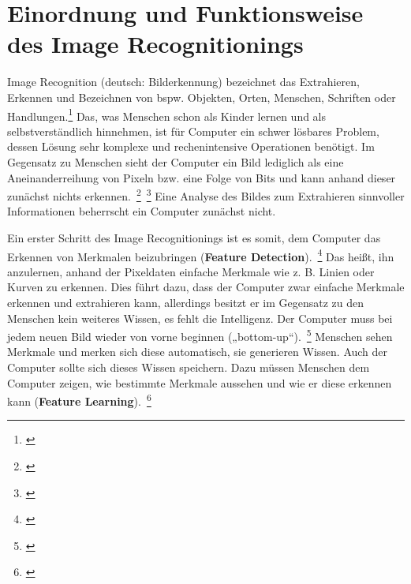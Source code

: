\section{Einordnung und Funktionsweise des Image Recognitionings}
\label{sec:Theorie}
Image Recognition (deutsch: Bilderkennung) bezeichnet das Extrahieren, Erkennen und Bezeichnen von bspw. Objekten, Orten, Menschen, Schriften oder Handlungen.\footnote{\cite{ImageRecognition}}  Das, was Menschen schon als Kinder lernen und als selbstverständlich hinnehmen, ist für Computer ein schwer lösbares Problem, dessen Lösung sehr komplexe und rechenintensive Operationen benötigt. Im Gegensatz zu Menschen sieht der Computer ein Bild lediglich als eine Aneinanderreihung von Pixeln bzw. eine Folge von Bits und kann anhand dieser zunächst nichts erkennen.~\footnote{\cite{Tensorflow}}~\footnote{\cite[S.~3]{Burger.2015}} Eine Analyse des Bildes zum Extrahieren sinnvoller Informationen beherrscht ein Computer zunächst nicht.

Ein erster Schritt des Image Recognitionings ist es somit, dem Computer das Erkennen von Merkmalen beizubringen (\textbf{Feature Detection}).~\footnote{\cite[S.~79--80]{Lindeberg.1998}}  Das heißt, ihn anzulernen, anhand der Pixeldaten einfache Merkmale wie z. B. Linien oder Kurven zu erkennen. Dies führt dazu, dass der Computer zwar einfache Merkmale erkennen und extrahieren kann, allerdings besitzt er im Gegensatz zu den Menschen kein weiteres Wissen, es fehlt die Intelligenz. Der Computer muss bei jedem neuen Bild wieder von vorne beginnen („bottom-up“).~\footnote{\cite[S.~3]{Burger.2015}}  Menschen sehen Merkmale und merken sich diese automatisch, sie generieren Wissen. Auch der Computer sollte sich dieses Wissen speichern. Dazu müssen Menschen dem Computer zeigen, wie bestimmte Merkmale aussehen und wie er diese erkennen kann (\textbf{Feature Learning}).~\footnote{\cite[S.~7--8]{HabibiAghdam.2017}}

